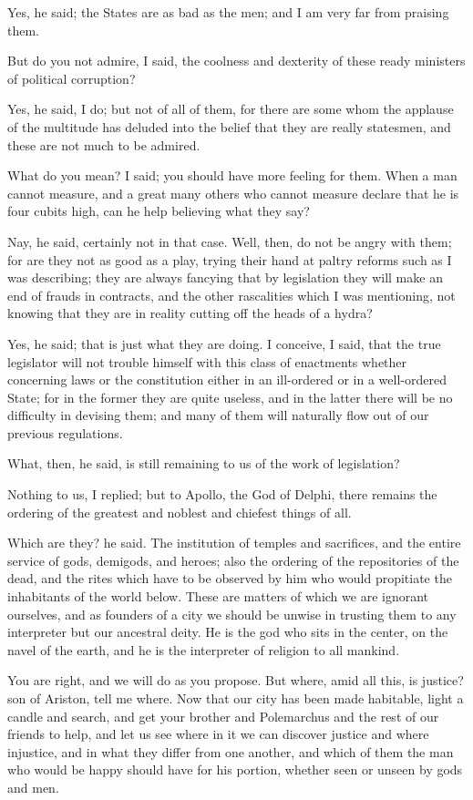 Yes, he said; the States are as bad as the men; and I am very far from praising them.

But do you not admire, I said, the coolness and dexterity of these ready ministers of political corruption?

Yes, he said, I do; but not of all of them, for there are some whom the applause of the multitude has deluded into the belief that they are really statesmen, and these are not much to be admired.

What do you mean? I said; you should have more feeling for them. When a man cannot measure, and a great many others who cannot measure declare that he is four cubits high, can he help believing what they say?

Nay, he said, certainly not in that case.
Well, then, do not be angry with them; for are they not as good as a play, trying their hand at paltry reforms such as I was describing; they are always fancying that by legislation they will make an end of frauds in contracts, and the other rascalities which I was mentioning, not knowing that they are in reality cutting off the heads of a hydra?

Yes, he said; that is just what they are doing.
I conceive, I said, that the true legislator will not trouble himself with this class of enactments whether concerning laws or the constitution either in an ill-ordered or in a well-ordered State; for in the former they are quite useless, and in the latter there will be no difficulty in devising them; and many of them will naturally flow out of our previous regulations.

What, then, he said, is still remaining to us of the work of legislation?

Nothing to us, I replied; but to Apollo, the God of Delphi, there remains the ordering of the greatest and noblest and chiefest things of all.

Which are they? he said.
The institution of temples and sacrifices, and the entire service of gods, demigods, and heroes; also the ordering of the repositories of the dead, and the rites which have to be observed by him who would propitiate the inhabitants of the world below. These are matters of which we are ignorant ourselves, and as founders of a city we should be unwise in trusting them to any interpreter but our ancestral deity. He is the god who sits in the center, on the navel of the earth, and he is the interpreter of religion to all mankind.

You are right, and we will do as you propose.
But where, amid all this, is justice? son of Ariston, tell me where. Now that our city has been made habitable, light a candle and search, and get your brother and Polemarchus and the rest of our friends to help, and let us see where in it we can discover justice and where injustice, and in what they differ from one another, and which of them the man who would be happy should have for his portion, whether seen or unseen by gods and men.

